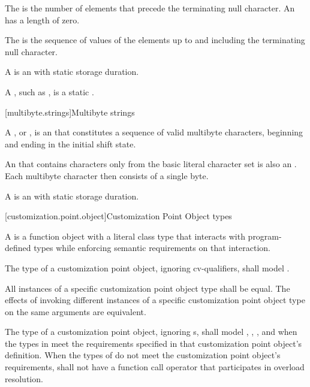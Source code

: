 \pnum
The 
is the number of elements that
precede the terminating null character.
An 
has a length of zero.

\pnum
The 
is the sequence of values of the
elements up to and including the terminating null character.

\pnum
A 
is an \ntbs{} with
static storage duration.
\begin{footnote}
A , such as
,
is a static \ntbs{}.
\end{footnote}

[multibyte.strings]{Multibyte strings}

%
\pnum
A ,
or \ntmbs{},
is an \ntbs{} that constitutes a
sequence of valid multibyte characters, beginning and ending in the initial
shift state.
\begin{footnote}
An \ntbs{} that contains characters only from the
basic literal character set is also an \ntmbs{}.
Each multibyte character then
consists of a single byte.
\end{footnote}

\pnum
A 
is an \ntmbs{} with static storage duration.

[customization.point.object]{Customization Point Object types}

\pnum
A  is a function object
with a literal class type that interacts with program-defined types while
enforcing semantic requirements on that interaction.

\pnum
The type of a customization point object, ignoring cv-qualifiers, shall model
.

\pnum
All instances of a specific customization point object type shall
be equal.
The effects of invoking different instances
of a specific customization point object type on the same arguments
are equivalent.

\pnum
The type  of a customization point object,
ignoring s, shall model
,
,
, and
when the types in  meet the requirements specified in that
customization point object's definition. When the types of  do
not meet the customization point object's requirements,  shall not have
a function call operator that participates in overload resolution.

